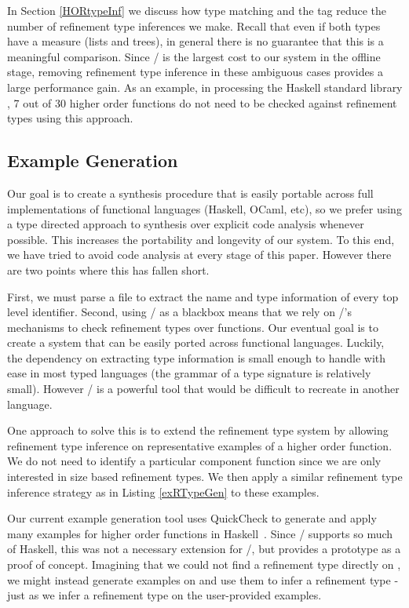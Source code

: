 In Section \ref{HORtypeInf} we discuss how type matching and the  tag reduce the number of refinement type inferences we make. Recall that even if both types have a measure (lists and trees), in general there is no guarantee that this is a meaningful comparison. Since \lhask/ is the largest cost to our system in the offline stage, removing refinement type inference in these ambiguous cases provides a large performance gain. As an example, in processing the Haskell standard library , 7 out of 30 higher order functions do not need to be checked against refinement types using this approach.


\subsection{Example Generation}\label{languageSupport}


Our goal is to create a synthesis procedure that is easily portable across full implementations of functional languages (Haskell, OCaml, etc), so we prefer using a type directed approach to synthesis over explicit code analysis whenever possible.
This increases the portability and longevity of our system.
To this end, we have tried to avoid code analysis at every stage of this paper.
However there are two points where this has fallen short.

First, we must parse a file to extract the name and type information of every top level identifier.
Second, using \lhask/ as a blackbox means that we rely on \lhask/'s mechanisms to check refinement types over functions.
Our eventual goal is to create a system that can be easily ported across functional languages.
Luckily, the dependency on extracting type information is small enough to handle with ease in most typed languages (the grammar of a type signature is relatively small).
However \lhask/ is a powerful tool that would be difficult to recreate in another language.

One approach to solve this is to extend the refinement type system by allowing refinement type inference on representative examples of a higher order function.
We do not need to identify a particular component function since we are only interested in size based refinement types.
We then apply a similar refinement type inference strategy as in Listing \ref{exRTypeGen} to these examples.

Our current example generation tool uses QuickCheck to generate and apply many examples for higher order functions in Haskell~\cite{quickcheck}.
Since \lhask/ supports so much of Haskell, this was not a necessary extension for \ourTool/, but provides a prototype as a proof of concept.
Imagining that we could not find a refinement type directly on , we might instead generate examples on and use them to infer a refinement type - just as we infer a refinement type on the user-provided examples.

